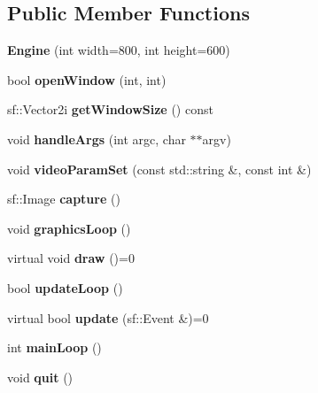 \subsection*{Public Member Functions}
\begin{DoxyCompactItemize}
\item 
{\bfseries Engine} (int width=800, int height=600)\hypertarget{classEngine_a584a47606683775104df9f2482658c22}{}\label{classEngine_a584a47606683775104df9f2482658c22}

\item 
bool {\bfseries open\+Window} (int, int)\hypertarget{classEngine_ac871cb91c5e3e89a393f8f949019cd2c}{}\label{classEngine_ac871cb91c5e3e89a393f8f949019cd2c}

\item 
sf\+::\+Vector2i {\bfseries get\+Window\+Size} () const \hypertarget{classEngine_ab9d1278fde66c010cba3b844a54867af}{}\label{classEngine_ab9d1278fde66c010cba3b844a54867af}

\item 
void {\bfseries handle\+Args} (int argc, char $\ast$$\ast$argv)\hypertarget{classEngine_a3b43df5b91bc06fa908d6a55d5f40b7d}{}\label{classEngine_a3b43df5b91bc06fa908d6a55d5f40b7d}

\item 
void {\bfseries video\+Param\+Set} (const std\+::string \&, const int \&)\hypertarget{classEngine_ab3f36faf089353dc0d020354d762788e}{}\label{classEngine_ab3f36faf089353dc0d020354d762788e}

\item 
sf\+::\+Image {\bfseries capture} ()\hypertarget{classEngine_abffb4aa8da34832c14c7b041b1c864b8}{}\label{classEngine_abffb4aa8da34832c14c7b041b1c864b8}

\item 
void {\bfseries graphics\+Loop} ()\hypertarget{classEngine_a8e0654bb674af345b9f7ca3f31219ec2}{}\label{classEngine_a8e0654bb674af345b9f7ca3f31219ec2}

\item 
virtual void {\bfseries draw} ()=0\hypertarget{classEngine_a04f3ee9b4ddc0d67406536a2fe525f31}{}\label{classEngine_a04f3ee9b4ddc0d67406536a2fe525f31}

\item 
bool {\bfseries update\+Loop} ()\hypertarget{classEngine_a6a34f4802fa7e66008518bc4e89e54d9}{}\label{classEngine_a6a34f4802fa7e66008518bc4e89e54d9}

\item 
virtual bool {\bfseries update} (sf\+::\+Event \&)=0\hypertarget{classEngine_a4d52da4c5d8620de700f4f19caf7b160}{}\label{classEngine_a4d52da4c5d8620de700f4f19caf7b160}

\item 
int {\bfseries main\+Loop} ()\hypertarget{classEngine_a100911d0f2947bf8a9a9273002da25e6}{}\label{classEngine_a100911d0f2947bf8a9a9273002da25e6}

\item 
void {\bfseries quit} ()\hypertarget{classEngine_abd6e5ae9f755e283f4cc6b69ab24c582}{}\label{classEngine_abd6e5ae9f755e283f4cc6b69ab24c582}

\end{DoxyCompactItemize}
